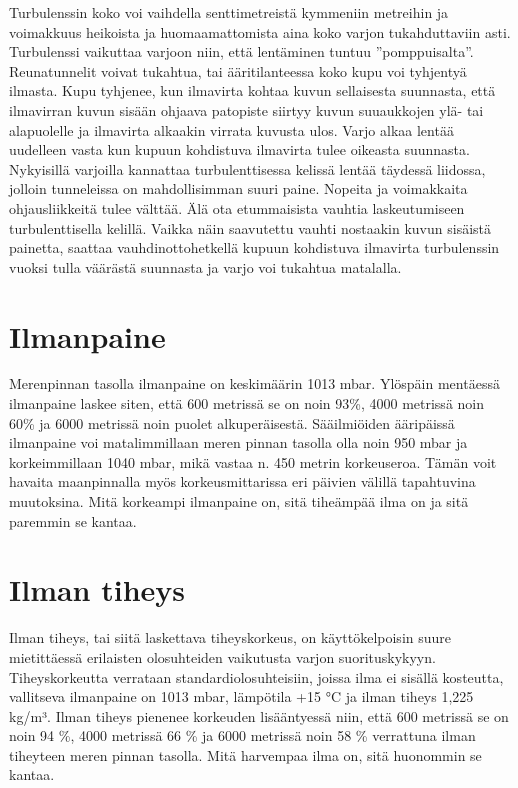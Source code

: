Turbulenssin koko voi vaihdella senttimetreistä kymmeniin metreihin ja voimakkuus heikoista ja huomaamattomista aina koko varjon tukahduttaviin asti. Turbulenssi vaikuttaa varjoon niin, että lentäminen tuntuu ”pomppuisalta”. Reunatunnelit voivat tukahtua, tai ääritilanteessa koko kupu voi tyhjentyä ilmasta. Kupu tyhjenee, kun ilmavirta kohtaa kuvun sellaisesta suunnasta, että ilmavirran kuvun sisään ohjaava patopiste siirtyy kuvun suuaukkojen ylä- tai alapuolelle ja ilmavirta alkaakin virrata kuvusta ulos. Varjo alkaa lentää uudelleen vasta kun kupuun kohdistuva ilmavirta tulee oikeasta suunnasta. Nykyisillä varjoilla kannattaa turbulenttisessa kelissä lentää täydessä liidossa, jolloin tunneleissa on mahdollisimman suuri paine. Nopeita ja voimakkaita ohjausliikkeitä tulee välttää. Älä ota etummaisista vauhtia laskeutumiseen turbulenttisella kelillä. Vaikka näin saavutettu vauhti nostaakin kuvun sisäistä painetta, saattaa vauhdinottohetkellä kupuun kohdistuva ilmavirta turbulenssin vuoksi tulla väärästä suunnasta ja varjo voi tukahtua matalalla. 

\section{ Ilmanpaine }
\label{ilmakehan-fysikaalisten-ominaisuuksien-vaikutukset-laskuvarjon-suorituskykyyn-ilmanpaine}


Merenpinnan tasolla ilmanpaine on keskimäärin 1013 mbar. Ylöspäin mentäessä ilmanpaine laskee siten, että 600 metrissä se on noin 93\%, 4000 metrissä noin 60\% ja 6000 metrissä noin puolet alkuperäisestä. Sääilmiöiden ääripäissä ilmanpaine voi matalimmillaan meren pinnan tasolla olla noin 950 mbar ja korkeimmillaan 1040 mbar, mikä vastaa n. 450 metrin korkeuseroa. Tämän voit havaita maanpinnalla myös korkeusmittarissa eri päivien välillä tapahtuvina muutoksina. Mitä korkeampi ilmanpaine on, sitä tiheämpää ilma on ja sitä paremmin se kantaa. 

\section{ Ilman tiheys }
\label{ilmakehan-fysikaalisten-ominaisuuksien-vaikutukset-laskuvarjon-suorituskykyyn-ilman-tiheys}


Ilman tiheys, tai siitä laskettava tiheyskorkeus, on käyttökelpoisin suure mietittäessä erilaisten olosuhteiden vaikutusta varjon suorituskykyyn. Tiheyskorkeutta verrataan standardiolosuhteisiin, joissa ilma ei sisällä kosteutta, vallitseva ilmanpaine on 1013 mbar, lämpötila +15 °C ja ilman tiheys 1,225 kg/m³. Ilman tiheys pienenee korkeuden lisääntyessä niin, että 600 metrissä se on noin 94 \%, 4000 metrissä 66 \% ja 6000 metrissä noin 58 \% verrattuna ilman tiheyteen meren pinnan tasolla. Mitä harvempaa ilma on, sitä huonommin se kantaa. 

